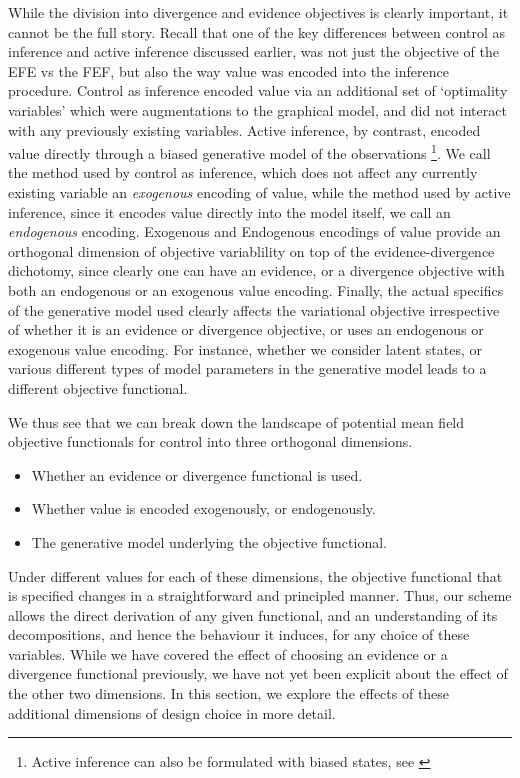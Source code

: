While the division into divergence and evidence objectives is clearly important, it cannot be the full story. Recall that one of the key differences between control as inference and active inference discussed earlier, was not just the objective of the EFE vs the FEF, but also the way value was encoded into the inference procedure. Control as inference encoded value via an additional set of `optimality variables' which were augmentations to the graphical model, and did not interact with any previously existing variables. Active inference, by contrast, encoded value directly through a biased generative model of the observations \footnote{Active inference can also be formulated with biased states, see  \citep{da2020active}}. We call the method used by control as inference, which does not affect any currently existing variable an \emph{exogenous} encoding of value, while the method used by active inference, since it encodes value directly into the model itself, we call an \emph{endogenous} encoding. Exogenous and Endogenous encodings of value provide an orthogonal dimension of objective variablility on top of the evidence-divergence dichotomy, since clearly one can have an evidence, or a divergence objective with both an endogenous or an exogenous value encoding. Finally, the actual specifics of the generative model used clearly affects the variational objective irrespective of whether it is an evidence or divergence objective, or uses an endogenous or exogenous value encoding. For instance, whether we consider latent states, or various different types of model parameters in the generative model leads to a different objective functional. 

We thus see that we can break down the landscape of potential mean field objective functionals for control into three orthogonal dimensions. 
\begin{itemize}
    \item Whether an evidence or divergence functional is used.
    \item Whether value is encoded exogenously, or endogenously.
    \item The generative model underlying the objective functional.
\end{itemize}

Under different values for each of these dimensions, the objective functional that is specified changes in a straightforward and principled manner. Thus, our scheme allows the direct derivation of any given functional, and an understanding of its decompositions, and hence the behaviour it induces, for any choice of these variables. While we have covered the effect of choosing an evidence or a divergence functional previously, we have not yet been explicit about the effect of the other two dimensions. In this section, we explore the effects of these additional dimensions of design choice in more detail.


